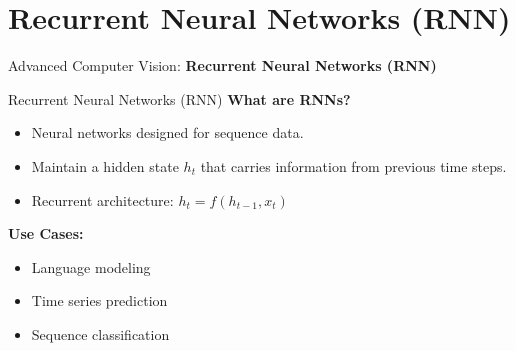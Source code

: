 \section{Recurrent Neural Networks (RNN)}
\begin{frame}{}
    \LARGE Advanced Computer Vision: \textbf{Recurrent Neural Networks (RNN)}
\end{frame}

\begin{frame}[allowframebreaks]{Recurrent Neural Networks (RNN)}
    \textbf{What are RNNs?}
        \begin{itemize}
            \item Neural networks designed for sequence data.
            \item Maintain a hidden state $h_t$ that carries information from previous time steps.
            \item Recurrent architecture: $h_t = f(h_{t-1}, x_t)$
        \end{itemize}
    \vspace{0.5cm}
    \textbf{Use Cases:}
        \begin{itemize}
            \item Language modeling
            \item Time series prediction
            \item Sequence classification
        \end{itemize}
    
\framebreak


\end{frame}
